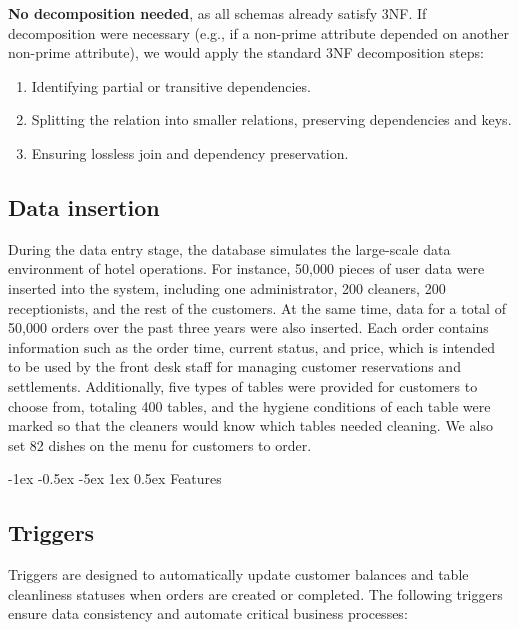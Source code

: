 \documentclass[12pt]{article}
\makeatletter
\renewcommand\section{\@startsection{section}{1}{\z@}%
    {-1ex \@plus -0.5ex \@minus -5ex} %
    {1ex \@plus 0.5ex} %
    {\normalfont\Large\bfseries}} %
\makeatother
\begin{document}
\textbf{No decomposition needed}, as all schemas already satisfy 3NF. If decomposition were necessary (e.g., if a non-prime attribute depended on another non-prime attribute), we would apply the standard 3NF decomposition steps:
\begin{enumerate}
    \item Identifying partial or transitive dependencies.
    \item Splitting the relation into smaller relations, preserving dependencies and keys.
    \item Ensuring lossless join and dependency preservation.
\end{enumerate}




\subsection{Data insertion}
During the data entry stage, the database simulates the large-scale data environment of hotel operations. For instance, 50,000 pieces of user data were inserted into the system, including one administrator, 200 cleaners, 200 receptionists, and the rest of the customers. At the same time, data for a total of 50,000 orders over the past three years were also inserted. Each order contains information such as the order time, current status, and price, which is intended to be used by the front desk staff for managing customer reservations and settlements. Additionally, five types of tables were provided for customers to choose from, totaling 400 tables, and the hygiene conditions of each table were marked so that the cleaners would know which tables needed cleaning. We also set 82 dishes on the menu for customers to order.




\section{Features}
\subsection{Triggers}
Triggers are designed to automatically update customer balances and table cleanliness statuses when orders are created or completed. The following triggers ensure data consistency and automate critical business processes:
\end{document}
